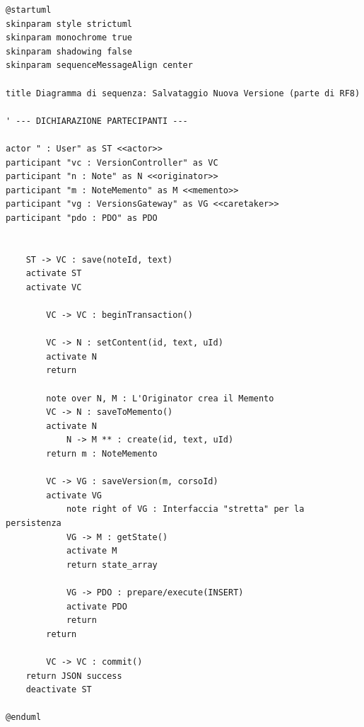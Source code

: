 \begin{verbatim}
@startuml
skinparam style strictuml
skinparam monochrome true
skinparam shadowing false
skinparam sequenceMessageAlign center

title Diagramma di sequenza: Salvataggio Nuova Versione (parte di RF8)

' --- DICHIARAZIONE PARTECIPANTI ---

actor " : User" as ST <<actor>>
participant "vc : VersionController" as VC
participant "n : Note" as N <<originator>>
participant "m : NoteMemento" as M <<memento>>
participant "vg : VersionsGateway" as VG <<caretaker>>
participant "pdo : PDO" as PDO


    ST -> VC : save(noteId, text)
    activate ST
    activate VC
        
        VC -> VC : beginTransaction()
        
        VC -> N : setContent(id, text, uId)
        activate N
        return
        
        note over N, M : L'Originator crea il Memento
        VC -> N : saveToMemento()
        activate N
            N -> M ** : create(id, text, uId)
        return m : NoteMemento
        
        VC -> VG : saveVersion(m, corsoId)
        activate VG
            note right of VG : Interfaccia "stretta" per la persistenza
            VG -> M : getState()
            activate M
            return state_array
            
            VG -> PDO : prepare/execute(INSERT)
            activate PDO
            return
        return
        
        VC -> VC : commit()
    return JSON success
    deactivate ST

@enduml
\end{verbatim}
